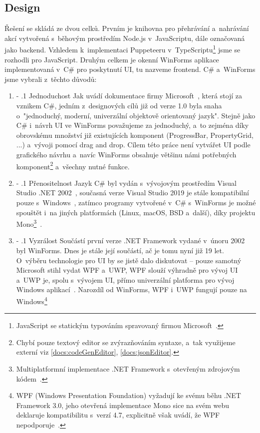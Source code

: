 \documentclass[12pt, a4paper, twoside]{article}
\makeatletter
\renewcommand\paragraph{%
	\@startsection{subparagraph}{5}{0mm}%
	{-\baselineskip}%
	{.1\baselineskip}%
	{\normalfont\normalsize\bfseries}}
\makeatother
\begin{document}
	\subsection{Design}
	\label{sub_sec:design}
	Řešení se skládá ze dvou celků. Prvním je knihovna pro přehrávání a~nahrávání akcí vytvořená s~běhovým prostředím Node.js v~JavaScriptu, dále označovaná jako backend. Vzhledem k~implementaci Puppeteeru v~TypeScriptu\footnote{JavaScript se statickým typováním spravovaný firmou Microsoft~\cite{typeScript}.} jsme se rozhodli pro JavaScript. 
	\newpage
	Druhým celkem je okenní WinForms aplikace implementovaná v~C\# pro poskytnutí UI, tu nazveme frontend. C\# a~WinForms jsme vybrali z~těchto důvodů:
	\begin{enumerate}[leftmargin=*]
		\item \paragraph{Jednoduchost}
		Jak uvádí dokumentace firmy Microsoft~\cite{csharpHistory}, která stojí za vznikem C\#, jedním z~designových cílů již od verze 1.0 byla snaha o~"jednoduchý, moderní, univerzální objektově orientovaný jazyk". Stejně jako C\# i~návrh UI ve WinForms považujeme za jednoduchý, a~to zejména díky obrovskému množství již existujících komponent (ProgressBar, PropertyGrid, ...) a~vývoji pomocí drag and drop. Cílem této práce není vytvářet UI podle grafického návrhu a~navíc WinForms obsahuje většinu námi potřebných komponent\footnote{Chybí pouze textový editor se zvýrazňováním syntaxe, a~tak využijeme externí viz \ref{docs:codeGenEditor}, \ref{docs:jsonEditor}.} a~všechny nutné funkce.
		\item \paragraph{Přenositelnost}
		Jazyk C\# byl vydán s~vývojovým prostředím Visual Studio .NET 2002~\cite{csharpHistory}, současná verze Visual Studio 2019 je stále  kompatibilní pouze s~Windows~\cite{visualStudioMainPage}, zatímco programy vytvořené v~C\# s~WinForms je možné spouštět i~na jiných platformách (Linux, macOS, BSD a~další), díky projektu Mono\footnote{Multiplatformní implementace .NET Framework s~otevřeným zdrojovým kódem~\cite{monoProject}.}~\cite{monoProject}.
		\item \paragraph{Vyzrálost}
		Součástí první verze .NET Framework vydané v~únoru 2002 byl WinForms. Dnes je stále její součástí, ač je tomu nyní již 19 let. O~výběru technologie pro UI by se jistě dalo diskutovat -- pouze samotný Microsoft stihl vydat WPF a~UWP, WPF slouží výhradně pro vývoj UI~\cite{wpfDocs} a~UWP je, spolu s~vývojem UI, přímo univerzální platforma pro vývoj Windows aplikací~\cite{uwpDocs}. Narozdíl od WinForms, WPF i~UWP fungují pouze na Windows\footnote{WPF (Windows Presentation Foundation) vyžadují ke svému běhu .NET Framework 3.0, jeho otevřená implementace Mono sice na svém webu deklaruje kompatibilitu s~verzí 4.7, explicitně však uvádí, že WPF nepodporuje~\cite{monoCompatibility}.
			
}
\end{enumerate}
\end{document}
